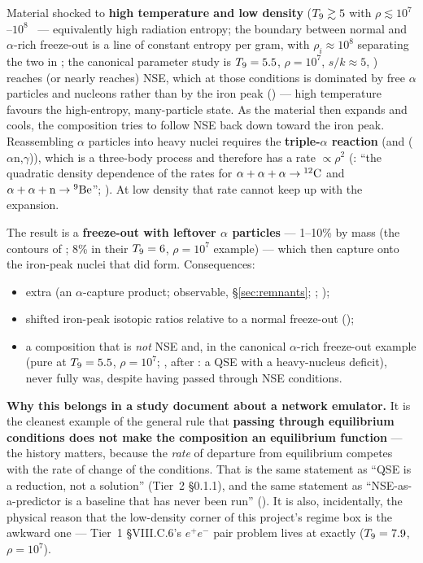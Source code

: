 Material shocked to \textbf{high temperature and low density} ($\Tn \gtrsim 5$
with $\rho \lesssim 10^{7}$--$10^{8}$~\gcc{} --- equivalently high radiation
entropy; the boundary between normal and $\alpha$-rich freeze-out is a line of
constant entropy per gram, with $\rho_i \approx 10^{8}$ separating the two in
\citealt[\S 2 and Fig.~1]{hix1999a}; the canonical parameter study is
$\Tn = 5.5$, $\rho = 10^{7}$, $s/k \approx 5$, \citealt{the1998}) reaches (or
nearly reaches) NSE, which at those conditions is dominated by free $\alpha$
particles and nucleons rather than by the iron peak
(\citealt[\S 5]{hix1999b}) --- high temperature favours the high-entropy,
many-particle state. As the material then expands and cools, the composition
tries to follow NSE back down toward the iron peak. Reassembling $\alpha$
particles into heavy nuclei requires the \textbf{triple-$\alpha$ reaction} (and
($\alpha$n,$\gamma$)), which is a three-body process and
therefore has a rate $\propto \rho^{2}$ (\citealt{hix1999a}: ``the quadratic
density dependence of the rates for $\alpha+\alpha+\alpha \to \nuc{C}{12}$ and
$\alpha+\alpha+\mathrm{n} \to \nuc{Be}{9}$''; \citealt{the1998}). At low density
that rate cannot keep up with the expansion.

The result is a \textbf{freeze-out with leftover $\alpha$ particles} --- 1--10\%
by mass (the  contours of \citealt[Fig.~1]{hix1999a}; 8\% in their
$\Tn = 6$, $\rho = 10^{7}$ example) --- which then capture onto the iron-peak
nuclei that did form. Consequences:

\begin{itemize}
\item extra  (an $\alpha$-capture product; observable,
  \S\ref{sec:remnants}; \citealt{the1998}; \citealt{jordan2003});
\item shifted iron-peak isotopic ratios relative to a normal freeze-out
  (\citealt[\S 5]{hix1999a});
\item a composition that is \emph{not} NSE and, in the canonical $\alpha$-rich
  freeze-out example (pure  at $\Tn = 5.5$, $\rho = 10^{7}$;
  \citealt{the1998}, after \citealt{meyer1998}: a QSE with a heavy-nucleus
  deficit), never fully was, despite having passed through NSE conditions.
\end{itemize}

\textbf{Why this belongs in a study document about a network emulator.} It is
the cleanest example of the general rule that \textbf{passing through
equilibrium conditions does not make the composition an equilibrium function}
--- the history matters, because the \emph{rate} of departure from equilibrium
competes with the rate of change of the conditions. That is the same statement
as ``QSE is a reduction, not a solution'' (Tier~2 \S 0.1.1), and the same
statement as ``NSE-as-a-predictor is a baseline that has never been run''
(). It is also, incidentally, the physical reason that the
low-density corner of this project's regime box is the awkward one --- Tier~1
\S VIII.C.6's $e^{+}e^{-}$ pair problem lives at exactly ($\Tn = 7.9$,
$\rho = 10^{7}$).

